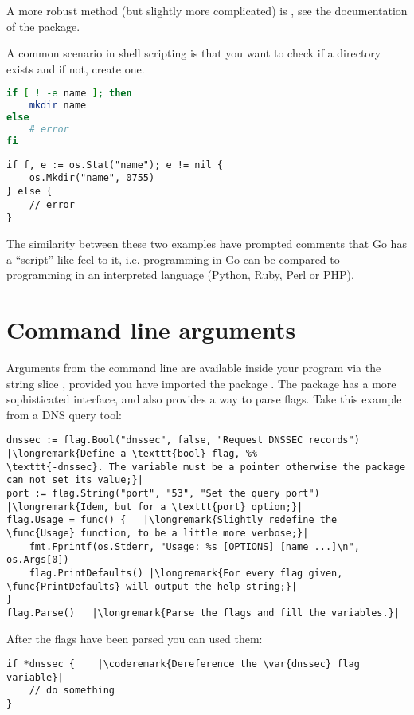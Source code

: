 A more robust method (but slightly more complicated) is , see the documentation
of the  package.

A common scenario in shell scripting is that you want to check if a directory
exists and if not, create one. 

\begin{minipage}{.5\textwidth}
\begin{lstlisting}[language=sh,caption={Create a directory with the shell}]
if [ ! -e name ]; then
    mkdir name
else
    # error
fi
\end{lstlisting}
\end{minipage}
\hspace{1em}
\begin{minipage}{.5\textwidth}
\begin{lstlisting}[caption={Create a directory with Go}]
if f, e := os.Stat("name"); e != nil {
    os.Mkdir("name", 0755)
} else {
    // error
}
\end{lstlisting}
\end{minipage}
The similarity between these two examples have prompted comments that Go has a
``script''-like feel to it, i.e. programming in Go can be compared to programming in
an interpreted language (Python, Ruby, Perl or PHP).

\section{Command line arguments}
\label{sec:option parsing}
Arguments from the command line are available inside your program via
the string slice , provided you have imported the package
. The  package has a more sophisticated
interface, and also provides a way to parse flags. Take this example
from a DNS query tool:
\begin{lstlisting}
dnssec := flag.Bool("dnssec", false, "Request DNSSEC records") |\longremark{Define a \texttt{bool} flag, %%
\texttt{-dnssec}. The variable must be a pointer otherwise the package can not set its value;}|
port := flag.String("port", "53", "Set the query port")      |\longremark{Idem, but for a \texttt{port} option;}|
flag.Usage = func() {   |\longremark{Slightly redefine the \func{Usage} function, to be a little more verbose;}|
    fmt.Fprintf(os.Stderr, "Usage: %s [OPTIONS] [name ...]\n", os.Args[0])
    flag.PrintDefaults() |\longremark{For every flag given, \func{PrintDefaults} will output the help string;}|
}
flag.Parse()   |\longremark{Parse the flags and fill the variables.}|
\end{lstlisting}
\showremarks
After the flags have been parsed you can used them:
\begin{lstlisting}
if *dnssec {    |\coderemark{Dereference the \var{dnssec} flag variable}|
    // do something
}
\end{lstlisting}

